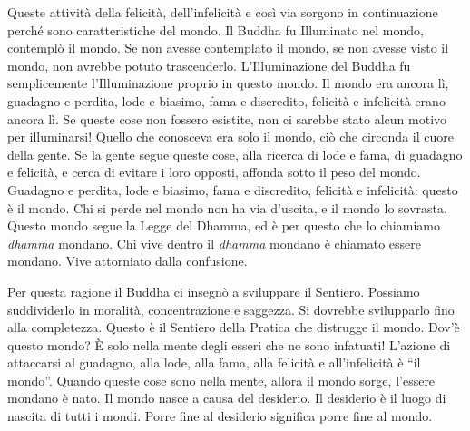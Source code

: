 Queste attività della felicità, dell'infelicità e così via sorgono in
continuazione perché sono caratteristiche del mondo. Il Buddha fu
Illuminato nel mondo, contemplò il mondo. Se non avesse contemplato il
mondo, se non avesse visto il mondo, non avrebbe potuto trascenderlo.
L'Illuminazione del Buddha fu semplicemente l'Illuminazione proprio in
questo mondo. Il mondo era ancora lì, guadagno e perdita, lode e
biasimo, fama e discredito, felicità e infelicità erano ancora lì. Se
queste cose non fossero esistite, non ci sarebbe stato alcun motivo per
illuminarsi! Quello che conosceva era solo il mondo, ciò che circonda il
cuore della gente. Se la gente segue queste cose, alla ricerca di lode e
fama, di guadagno e felicità, e cerca di evitare i loro opposti, affonda
sotto il peso del mondo. Guadagno e perdita, lode e biasimo, fama e
discredito, felicità e infelicità: questo è il mondo. Chi si perde nel
mondo non ha via d'uscita, e il mondo lo sovrasta. Questo mondo segue la
Legge del Dhamma, ed è per questo che lo chiamiamo \emph{dhamma}
mondano. Chi vive dentro il \emph{dhamma} mondano è chiamato essere
mondano. Vive attorniato dalla confusione.

Per questa ragione il Buddha ci insegnò a sviluppare il Sentiero.
Possiamo suddividerlo in moralità, concentrazione e saggezza. Si
dovrebbe svilupparlo fino alla completezza. Questo è il Sentiero della
Pratica che distrugge il mondo. Dov'è questo mondo? È solo nella mente
degli esseri che ne sono infatuati! L'azione di attaccarsi al guadagno,
alla lode, alla fama, alla felicità e all'infelicità è ``il mondo''.
Quando queste cose sono nella mente, allora il mondo sorge, l'essere
mondano è nato. Il mondo nasce a causa del desiderio. Il desiderio è il
luogo di nascita di tutti i mondi. Porre fine al desiderio significa
porre fine al mondo.

